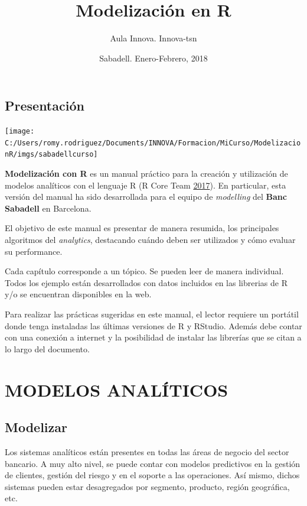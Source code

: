 \documentclass[]{book}
\title{Modelización en R}
\author{Aula Innova. Innova-tsn}
\date{Sabadell. Enero-Febrero, 2018}
\begin{document}
\maketitle

{
\setcounter{tocdepth}{1}
\tableofcontents
}
\hypertarget{presentacion}{%
\chapter*{Presentación}\label{presentacion}}

\texttt{[image: C:/Users/romy.rodriguez/Documents/INNOVA/Formacion/MiCurso/ModelizacionR/imgs/sabadellcurso]}

\textbf{Modelización con R} es un manual práctico para la creación y utilización de modelos analíticos con el lenguaje R (R Core Team \protect\hyperlink{ref-R-base}{2017}). En particular, esta versión del manual ha sido desarrollada para el equipo de \emph{modelling} del \textbf{Banc Sabadell} en Barcelona.

El objetivo de este manual es presentar de manera resumida, los principales algoritmos del \emph{analytics}, destacando cuándo deben ser utilizados y cómo evaluar su performance.

Cada capítulo corresponde a un tópico. Se pueden leer de manera individual. Todos los ejemplo están desarrollados con datos incluidos en las librerias de R y/o se encuentran disponibles en la web.

Para realizar las prácticas sugeridas en este manual, el lector requiere un portátil donde tenga instaladas las últimas versiones de R y RStudio. Además debe contar con una conexión a internet y la posibilidad de instalar las librerías que se citan a lo largo del documento.

\hypertarget{part-modelos-analiticos}{%
\part{MODELOS ANALÍTICOS}\label{part-modelos-analiticos}}

\hypertarget{modelizacion}{%
\chapter{Modelizar}\label{modelizacion}}

Los sistemas analíticos están presentes en todas las áreas de negocio del sector bancario. A muy alto nivel, se puede contar con modelos predictivos en la gestión de clientes, gestión del riesgo y en el soporte a las operaciones. Así mismo, dichos sistemas pueden estar desagregados por segmento, producto, región geográfica, etc.
\end{document}
